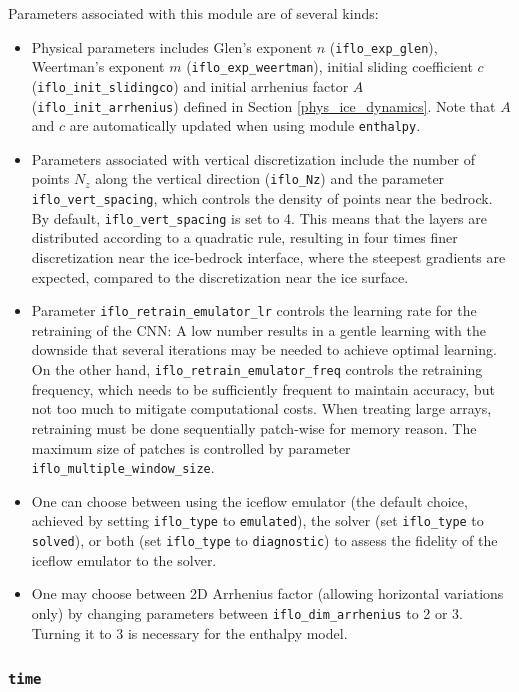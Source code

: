 \documentclass[10pt,twocolumn]{article}
\begin{document}
Parameters associated with this module are of several kinds:
\begin{itemize}
\item Physical parameters includes Glen's exponent $n$ (\texttt{iflo\_exp\_glen}), Weertman's exponent $m$
(\texttt{iflo\_exp\_weertman}), initial sliding coefficient $c$ (\texttt{iflo\_init\_slidingco}) 
and initial arrhenius factor $A$ (\texttt{iflo\_init\_arrhenius}) defined in Section \ref{phys_ice_dynamics}.
Note that $A$ and $c$ are automatically updated when using module \texttt{enthalpy}.
\item Parameters associated with vertical discretization include the number of points $N_z$ 
along the vertical direction (\texttt{iflo\_Nz}) and the parameter 
\texttt{iflo\_vert\_spacing}, which controls the density of points near the bedrock. 
By default, \texttt{iflo\_vert\_spacing} is set to 4. This means that the layers are 
distributed according to a quadratic rule, resulting in four times finer 
discretization near the ice-bedrock interface, where the steepest gradients are expected, 
compared to the discretization near the ice surface.
\item Parameter \texttt{iflo\_retrain\_emulator\_lr} controls the learning rate for the retraining
of the CNN: A low number results in a gentle learning with the downside that several iterations
may be needed to achieve optimal learning. On the other hand, \texttt{iflo\_retrain\_emulator\_freq} 
controls the retraining frequency, which needs to be sufficiently frequent to maintain accuracy,
but not too much to mitigate computational costs.
When treating large arrays, retraining must be done sequentially patch-wise for memory reason. 
The maximum size of patches is controlled by parameter \texttt{iflo\_multiple\_window\_size}.
\item One can choose between using the iceflow emulator (the default choice, achieved 
by setting \texttt{iflo\_type} to \texttt{emulated}), the solver (set \texttt{iflo\_type} 
to \texttt{solved}), or both (set \texttt{iflo\_type} to \texttt{diagnostic})
to assess the fidelity of the iceflow emulator to the solver.
\item One may choose between 2D Arrhenius factor (allowing horizontal variations only)
by changing parameters between \texttt{iflo\_dim\_arrhenius} to 2 or 3. 
Turning it to 3 is necessary for the enthalpy model.
\end{itemize}

\subsubsection{\texttt{time}}
\label{module_time}
\end{document}
